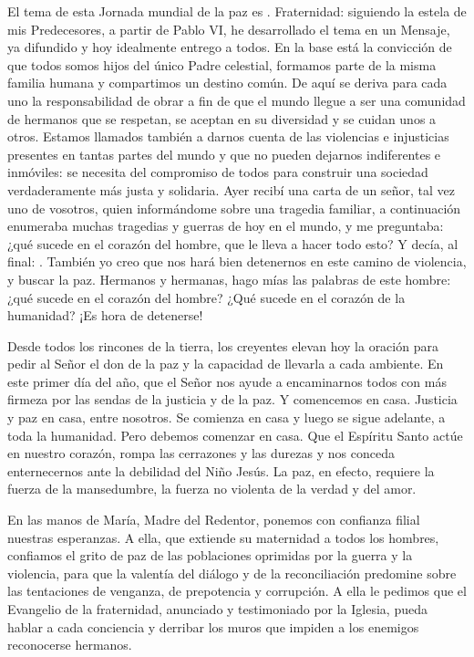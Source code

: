\begin{body}
	El tema de esta Jornada mundial de la paz es . Fraternidad: siguiendo la estela de mis Predecesores, a partir de Pablo VI, he desarrollado el tema en un Mensaje, ya difundido y hoy idealmente entrego a todos. En la base está la convicción de que todos somos hijos del único Padre celestial, formamos parte de la misma familia humana y compartimos un destino común. De aquí se deriva para cada uno la responsabilidad de obrar a fin de que el mundo llegue a ser una comunidad de hermanos que se respetan, se aceptan en su diversidad y se cuidan unos a otros. Estamos llamados también a darnos cuenta de las violencias e injusticias presentes en tantas partes del mundo y que no pueden dejarnos indiferentes e inmóviles: se necesita del compromiso de todos para construir una sociedad verdaderamente más justa y solidaria. Ayer recibí una carta de un señor, tal vez uno de vosotros, quien informándome sobre una tragedia familiar, a continuación enumeraba muchas tragedias y guerras de hoy en el mundo, y me preguntaba: ¿qué sucede en el corazón del hombre, que le lleva a hacer todo esto? Y decía, al final: . También yo creo que nos hará bien detenernos en este camino de violencia, y buscar la paz. Hermanos y hermanas, hago mías las palabras de este hombre: ¿qué sucede en el corazón del hombre? ¿Qué sucede en el corazón de la humanidad? ¡Es hora de detenerse!
	
	Desde todos los rincones de la tierra, los creyentes elevan hoy la oración para pedir al Señor el don de la paz y la capacidad de llevarla a cada ambiente. En este primer día del año, que el Señor nos ayude a encaminarnos todos con más firmeza por las sendas de la justicia y de la paz. Y comencemos en casa. Justicia y paz en casa, entre nosotros. Se comienza en casa y luego se sigue adelante, a toda la humanidad. Pero debemos comenzar en casa. Que el Espíritu Santo actúe en nuestro corazón, rompa las cerrazones y las durezas y nos conceda enternecernos ante la debilidad del Niño Jesús. La paz, en efecto, requiere la fuerza de la mansedumbre, la fuerza no violenta de la verdad y del amor.
	
	En las manos de María, Madre del Redentor, ponemos con confianza filial nuestras esperanzas. A ella, que extiende su maternidad a todos los hombres, confiamos el grito de paz de las poblaciones oprimidas por la guerra y la violencia, para que la valentía del diálogo y de la reconciliación predomine sobre las tentaciones de venganza, de prepotencia y corrupción. A ella le pedimos que el Evangelio de la fraternidad, anunciado y testimoniado por la Iglesia, pueda hablar a cada conciencia y derribar los muros que impiden a los enemigos reconocerse hermanos.
\end{body}

